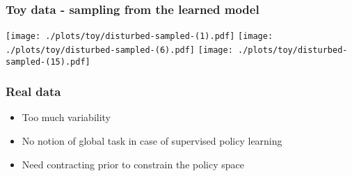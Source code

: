 \documentclass[xcolor=svgnames,table]{beamer}
\begin{document}
\begin{frame}
\frametitle{Toy data - sampling from the learned model}
\begin{center}
   {\texttt{[image: ./plots/toy/disturbed-sampled-(1).pdf]}}
   {\texttt{[image: ./plots/toy/disturbed-sampled-(6).pdf]}}
   {\texttt{[image: ./plots/toy/disturbed-sampled-(15).pdf]}}
\end{center}
\end{frame}




\begin{frame}
\frametitle{Real data}
\begin{itemize}
  \item Too much variability
  \item No notion of global task in case of supervised policy learning
  \item Need contracting prior to constrain the policy space
\end{itemize}
\end{frame}
\end{document}
